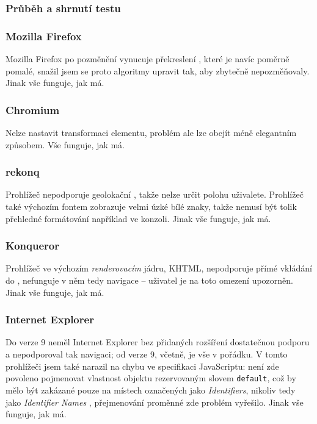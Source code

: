 \subsubsection{Průběh a shrnutí testu}
\subsubsection*{Mozilla Firefox}
Mozilla Firefox po pozměnění vynucuje překreslení , které je navíc poměrně pomalé, snažil jsem se proto algoritmy upravit tak, aby  zbytečně nepozměňovaly. Jinak vše funguje, jak má.

\subsubsection*{Chromium}
Nelze nastavit transformaci  elementu, problém ale lze obejít méně elegantním způsobem. Vše funguje, jak má.

\subsubsection*{rekonq}
Prohlížeč nepodporuje geolokační , takže nelze určit polohu uživalete. Prohlížeč také výchozím fontem zobrazuje velmi úzké bílé znaky, takže nemusí být tolik přehledné formátování například ve  konzoli. Jinak vše funguje, jak má.

\subsubsection*{Konqueror}
Prohlížeč ve výchozím \textit{renderovacím} jádru, KHTML, nepodporuje přímé vkládání  do , nefunguje v něm tedy navigace -- uživatel je na toto omezení upozorněn. Jinak vše funguje, jak má.

\subsubsection*{Internet Explorer}
Do verze 9 neměl Internet Explorer bez přidaných rozšíření dostatečnou podporu  a nepodporoval tak navigaci; od verze 9, včetně, je vše v pořádku. V tomto prohlížeči jsem také narazil na chybu ve specifikaci JavaScriptu: není zde povoleno pojmenovat vlastnost objektu rezervovaným slovem \texttt{default}, což by mělo být zakázané pouze na místech označených jako \textit{Identifiers}, nikoliv tedy jako \textit{Identifier Names} \cite{JsIdentifiers}, přejmenování proměnné zde problém vyřešilo. Jinak vše funguje, jak má.

